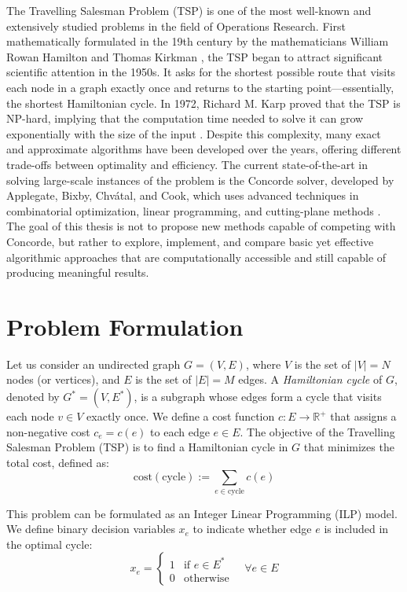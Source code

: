 The Travelling Salesman Problem (TSP) is one of the most well-known and extensively studied problems in the field of Operations Research. 
First mathematically formulated in the 19th century by the mathematicians William Rowan Hamilton and Thomas Kirkman \cite{Biggs1986Graph}, the TSP began to attract significant scientific attention in the 1950s. 
It asks for the shortest possible route that visits each node in a graph exactly once and returns to the starting point—essentially, the shortest Hamiltonian cycle. 
In 1972, Richard M. Karp proved that the TSP is NP-hard, implying that the computation time needed to solve it can grow exponentially with the size of the input \cite{Karp1972}. Despite this complexity, 
many exact and approximate algorithms have been developed over the years, offering different trade-offs between optimality and efficiency. The current state-of-the-art in solving large-scale 
instances of the problem is the Concorde solver, developed by Applegate, Bixby, Chvátal, and Cook, which uses advanced techniques in combinatorial optimization, linear programming, and cutting-plane methods \cite{Applegate2006}. 
The goal of this thesis is not to propose new methods capable of competing with Concorde, but rather to explore, implement, 
and compare basic yet effective algorithmic approaches that are computationally accessible and still capable of producing meaningful results.


\section{Problem Formulation}

Let us consider an undirected graph $G = (V, E)$, where $V$ is the set of $|V| = N$ nodes (or vertices), 
and $E$ is the set of $|E| = M$ edges. A \textit{Hamiltonian cycle} of $G$, denoted by $G^* = (V, E^*)$, 
is a subgraph whose edges form a cycle that visits each node $v \in V$ exactly once.
We define a cost function $c : E \rightarrow \mathbb{R}^+$ that assigns a non-negative cost $c_e = c(e)$ to each edge $e \in E$. 
The objective of the Travelling Salesman Problem (TSP) is to find a Hamiltonian cycle in $G$ that minimizes the total cost, defined as:
\[
\text{cost}(\text{cycle}) := \sum_{e \in \text{cycle}} c(e)
\]

This problem can be formulated as an Integer Linear Programming (ILP) model. We define binary decision variables $x_e$ to indicate whether edge $e$ is included in the optimal cycle:
\[
x_e =
\begin{cases}
1 & \text{if } e \in E^* \\
0 & \text{otherwise}
\end{cases}
\quad \forall e \in E
\]

